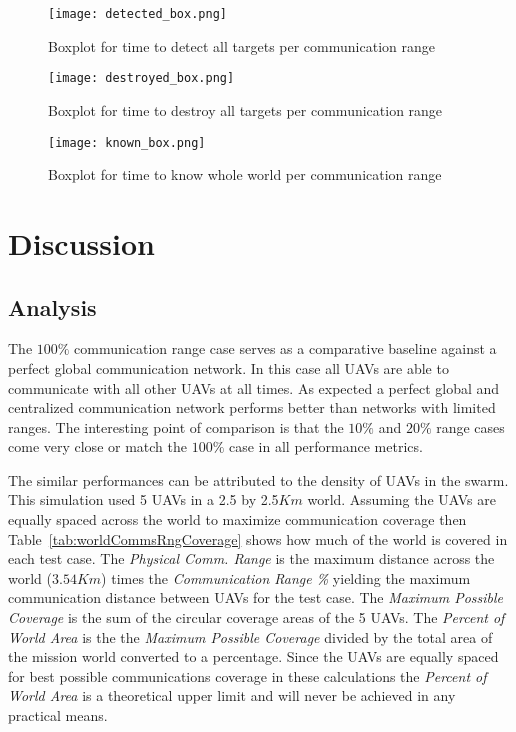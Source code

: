 \begin{figure*}%
	\centering
	\texttt{[image: detected\_box.png]}
	\caption{Boxplot for time to detect all targets per communication range}
	\label{fig:detectBoxPlot}
\end{figure*}

\begin{figure*}%
	\centering
	\texttt{[image: destroyed\_box.png]}
	\caption{Boxplot for time to destroy all targets per communication range}
	\label{fig:destroyedBoxPlot}
\end{figure*}

\begin{figure*}%
	\centering
	\texttt{[image: known\_box.png]}
	\caption{Boxplot for time to know whole world per communication range}
	\label{fig:knownBoxPlot}
\end{figure*}




\chapter{Discussion}
\label{chap:discussion}

\section{Analysis}

The $100\%$ communication range case serves as a comparative baseline against a perfect global communication network.  In this case all UAVs are able to communicate with all other UAVs at all times.  As expected a perfect global and centralized communication network performs better than networks with limited ranges.  The interesting point of comparison is that the $10\%$ and $20\%$ range cases come very close or match the $100\%$ case in all performance metrics. 

The similar performances can be attributed to the density of UAVs in the swarm.  This simulation used 5 UAVs in a 2.5 by 2.5$Km$ world.  Assuming the UAVs are equally spaced across the world to maximize communication coverage then Table~\ref{tab:worldCommsRngCoverage} shows how much of the world is covered in each test case.  The \textit{Physical Comm. Range} is the maximum distance across the world ($3.54Km$) times the \textit{Communication Range \%} yielding the maximum communication distance between UAVs for the test case.  The \textit{Maximum Possible Coverage} is the sum of the circular coverage areas of the 5 UAVs.  The \textit{Percent of World Area} is the the \textit{Maximum Possible Coverage} divided by the total area of the mission world converted to a percentage.  Since the UAVs are equally spaced for best possible communications coverage in these calculations the \textit{Percent of World Area} is a theoretical upper limit and will never be achieved in any practical means.


